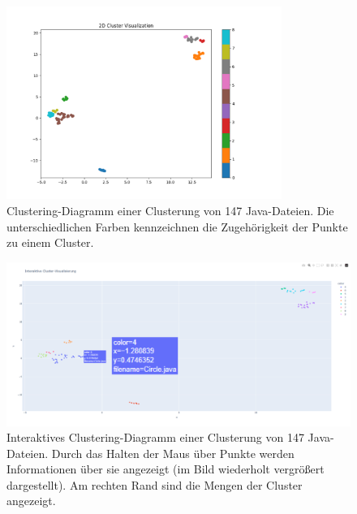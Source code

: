 \begin{figure} %
	\centering
	\includegraphics[width=0.8\textwidth]{images/Erstes Clustering-Diagramm.pdf}
	\caption{Clustering-Diagramm einer Clusterung von 147 Java-Dateien. Die unterschiedlichen Farben kennzeichnen die Zugehörigkeit der Punkte zu einem Cluster.}
	\label{Erstes Clustering-Diagramm}
\end{figure}

\begin{figure} %
	\centering
	\includegraphics[width=1.0\textwidth]{images/Interaktives Clustering-Diagramm.pdf}
	\caption{Interaktives Clustering-Diagramm einer Clusterung von 147 Java-Dateien. Durch das Halten der Maus über Punkte werden Informationen über sie angezeigt (im Bild wiederholt vergrößert dargestellt). Am rechten Rand sind die Mengen der Cluster angezeigt.}
	\label{Interaktives Clustering-Diagramm}
\end{figure}

